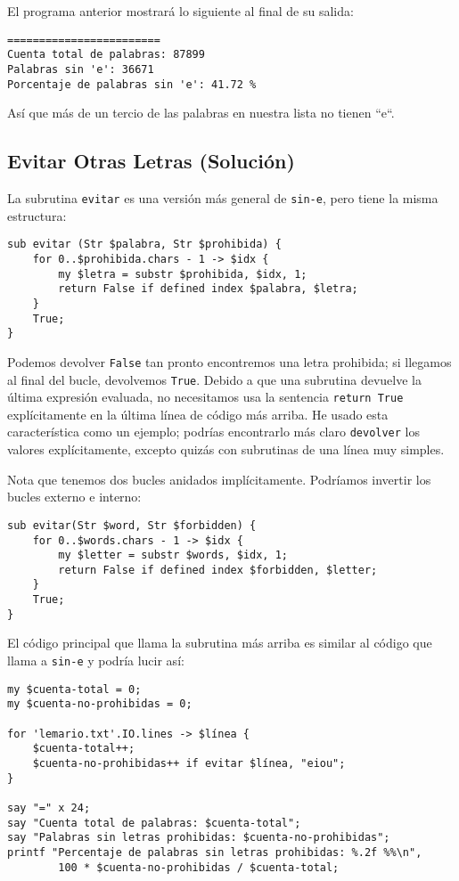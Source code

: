 El programa anterior mostrará lo siguiente al final de 
su salida:

\begin{verbatim}
========================
Cuenta total de palabras: 87899
Palabras sin 'e': 36671
Porcentaje de palabras sin 'e': 41.72 %
\end{verbatim}

Así que más de un tercio de las palabras en nuestra lista no
tienen ``e``.

\subsection{Evitar Otras Letras (Solución)}

La subrutina {\tt evitar} es una versión más general de 
\verb|sin-e|, pero tiene la misma estructura:

\begin{verbatim}
sub evitar (Str $palabra, Str $prohibida) {
    for 0..$prohibida.chars - 1 -> $idx {
        my $letra = substr $prohibida, $idx, 1;
        return False if defined index $palabra, $letra;
    }
    True;
}

\end{verbatim}
%
Podemos devolver {\tt False} tan pronto encontremos una letra
prohibida; si llegamos al final del bucle, devolvemos {\tt True}.
Debido a que una subrutina devuelve la última expresión evaluada,
no necesitamos usa la sentencia {\tt return True} explícitamente
en la última línea de código más arriba. He usado esta característica
como un ejemplo; podrías encontrarlo más claro {\tt devolver} los valores 
explícitamente, excepto quizás con subrutinas de una línea muy simples.

Nota que tenemos dos bucles anidados implícitamente. Podríamos 
invertir los bucles externo e interno:

\begin{verbatim}
sub evitar(Str $word, Str $forbidden) {
    for 0..$words.chars - 1 -> $idx {
        my $letter = substr $words, $idx, 1;
        return False if defined index $forbidden, $letter;
    }
    True;
}
\end{verbatim}
%

El código principal que llama la subrutina más arriba es similar
al código que llama a {\tt sin-e} y podría lucir así:

\begin{verbatim}
my $cuenta-total = 0;
my $cuenta-no-prohibidas = 0;

for 'lemario.txt'.IO.lines -> $línea { 
    $cuenta-total++;
    $cuenta-no-prohibidas++ if evitar $línea, "eiou";
}

say "=" x 24;
say "Cuenta total de palabras: $cuenta-total";
say "Palabras sin letras prohibidas: $cuenta-no-prohibidas";
printf "Percentaje de palabras sin letras prohibidas: %.2f %%\n", 
        100 * $cuenta-no-prohibidas / $cuenta-total;
\end{verbatim}    
%
  

